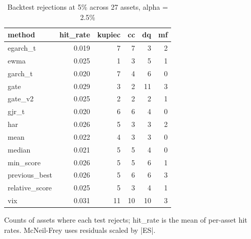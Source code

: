 \begin{table}[t]
\centering
\small
\caption{Backtest rejections at 5\% across 27 assets, alpha = 2.5\%}
\label{tab:backtests}
\begin{tabular}{lrrrrr}
\toprule
method & hit\_rate & kupiec & cc & dq & mf \\
\midrule
egarch\_t & 0.019 & 7 & 7 & 3 & 2 \\
ewma & 0.025 & 1 & 3 & 5 & 1 \\
garch\_t & 0.020 & 7 & 4 & 6 & 0 \\
gate & 0.029 & 3 & 2 & 11 & 3 \\
gate\_v2 & 0.025 & 2 & 2 & 2 & 1 \\
gjr\_t & 0.020 & 6 & 6 & 4 & 0 \\
har & 0.026 & 5 & 3 & 3 & 2 \\
mean & 0.022 & 4 & 3 & 3 & 0 \\
median & 0.021 & 5 & 5 & 4 & 0 \\
min\_score & 0.026 & 5 & 5 & 6 & 1 \\
previous\_best & 0.026 & 5 & 6 & 6 & 3 \\
relative\_score & 0.025 & 5 & 3 & 4 & 1 \\
vix & 0.031 & 11 & 10 & 10 & 3 \\
\bottomrule
\end{tabular}
\par\footnotesize Counts of assets where each test rejects; hit\_rate is the mean of per-asset hit rates. McNeil-Frey uses residuals scaled by |ES|.
\end{table}
